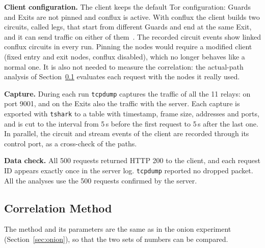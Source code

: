 \documentclass[10pt,a4paper]{article}
\numberwithin{figure}{section}
\numberwithin{table}{section}
\begin{document}
\textbf{Client configuration.} The client keeps the default Tor configuration:
Guards and Exits are not pinned and conflux is active. With conflux the client
builds two circuits, called legs, that start from different Guards and end at the
same Exit, and it can send traffic on either of them~\cite{alsabah2013path}. The
recorded circuit events show linked conflux circuits in every run. Pinning the
nodes would require a modified client (fixed entry and exit nodes, conflux
disabled), which no longer behaves like a normal one. It is also not needed to
measure the correlation: the actual-path analysis of
Section~\ref{sec:clearnet-method} evaluates each request with the nodes it really
used.

\textbf{Capture.} During each run \texttt{tcpdump} captures the traffic of all the
11 relays: on port 9001, and on the Exits also the traffic with the server. Each
capture is exported with \texttt{tshark} to a table with timestamp, frame size,
addresses and ports, and is cut to the interval from 5\,s before the first
request to 5\,s after the last one. In parallel, the circuit and stream events of
the client are recorded through its control port, as a cross-check of the paths.

\textbf{Data check.} All 500 requests returned HTTP 200 to the client, and each
request ID appears exactly once in the server log. \texttt{tcpdump} reported no
dropped packet. All the analyses use the 500 requests confirmed by the server.

\subsection{Correlation Method}
\label{sec:clearnet-method}

The method and its parameters are the same as in the onion experiment
(Section~\ref{sec:onion}), so that the two sets of numbers can be compared.
\end{document}
